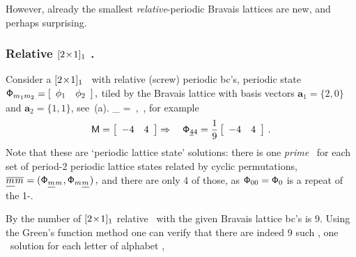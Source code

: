 However, already the smallest \emph{relative}-periodic
Bravais lattices are new, and perhaps
surprising.

\subsubsection{Relative  ${[2\!\times\!1]_{1}}$ \twot.}
\label{s:catLattRel2x1}

Consider a ${[2\!\times\!1]_{1}}$ \twot\ with relative (screw) periodic bc's,
periodic state
\(
\mathsf{\Phi}_{{m_{1}}{m_{2}}} =
 [
 \begin{array}{cc}
 \phi_{1} & \phi_{2}
 \end{array}
 ]
\,,
\)
tiled by the Bravais lattice
 with basis vectors $\mathbf{a}_1=\{2,0\}$ and $\mathbf{a}_2=\{1,1\}$, see \,(a).
\beq
\Xx_{\underline{\Ssym{}}\Ssym{}} = 
        \,,\qquad
\Ssym{}\in\A
         \,,
for example
\[
\Mm =
 \left[
 \begin{array}{cc}
 -4 & 4
 \end{array}
 \right]
 \Rightarrow\quad
\Xx_{\underline{4}4} = \frac{1}{9}
 \left[
 \begin{array}{cc}
 -4 & 4
 \end{array}
 \right]
 \,.
\]
Note that these are `periodic lattice state' solutions: there is one \emph{prime}
\twot\ for each set of period-2 periodic lattice states related by cyclic
permutations,
\(
{\overline{\underline{{m_{}}}{m_{}}}}
    =
(\mathsf{\Phi}_{\underline{{m_{}}}{m_{}}}, \mathsf{\Phi}_{{m_{}}\underline{{m_{}}}})
\,,
\)
and there are only 4 of those, as $\mathsf{\Phi}_{00}=\mathsf{\Phi}_{0}$ is a repeat of the
1-\brick.

By  the number of ${[2\!\times\!1]_{1}}$ relative
\twots\ with the given Bravais lattice bc's is 9.
Using the Green's function method  one can verify
that there are indeed 9 such \twots,
one \twot\ solution for each letter of alphabet ,

